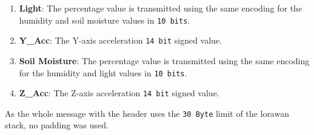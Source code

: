 \begin{enumerate}
    \item \textbf{Light}: The percentage value is transmitted using the same encoding for the humidity and soil moisture values in \texttt{10 bits}.
    \item \textbf{Y\_Acc}: The Y-axis acceleration \texttt{14 bit} signed value.
    \item \textbf{Soil Moisture}: The percentage value is transmitted using the same encoding for the humidity and light values in \texttt{10 bits}.
    \item \textbf{Z\_Acc}: The Z-axis acceleration \texttt{14 bit} signed value.
\end{enumerate}

As the whole message with the header uses the \texttt{30 Byte} limit of the \acrshort{lorawan} stack, no padding was used.

